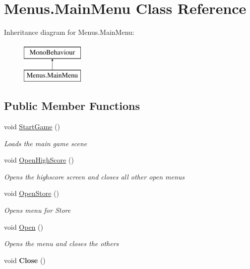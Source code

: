 \hypertarget{class_menus_1_1_main_menu}{}\section{Menus.\+Main\+Menu Class Reference}
\label{class_menus_1_1_main_menu}
Inheritance diagram for Menus.\+Main\+Menu\+:\begin{figure}[H]
\begin{center}
\leavevmode
\includegraphics[height=2.000000cm]{class_menus_1_1_main_menu}
\end{center}
\end{figure}
\subsection*{Public Member Functions}
\begin{DoxyCompactItemize}
\item 
void \hyperlink{class_menus_1_1_main_menu_ac97747732432fa983f5a6cb92642df3b}{Start\+Game} ()
\begin{DoxyCompactList}\small\item\em Loads the main game scene \end{DoxyCompactList}\item 
void \hyperlink{class_menus_1_1_main_menu_aa2927bfce459657e7e199a0db8f11d4b}{Open\+High\+Score} ()
\begin{DoxyCompactList}\small\item\em Opens the highscore screen and closes all other open menus \end{DoxyCompactList}\item 
void \hyperlink{class_menus_1_1_main_menu_ae6e4123928bc580afc1469dddd860166}{Open\+Store} ()
\begin{DoxyCompactList}\small\item\em Opens menu for Store \end{DoxyCompactList}\item 
void \hyperlink{class_menus_1_1_main_menu_a3779e5d70d9a7fb549378d6e14709284}{Open} ()
\begin{DoxyCompactList}\small\item\em Opens the menu and closes the others \end{DoxyCompactList}\item 
void {\bfseries Close} ()\hypertarget{class_menus_1_1_main_menu_aea5a4a0bc02f1464a233fed2430d3e32}{}\label{class_menus_1_1_main_menu_aea5a4a0bc02f1464a233fed2430d3e32}

\end{DoxyCompactItemize}


